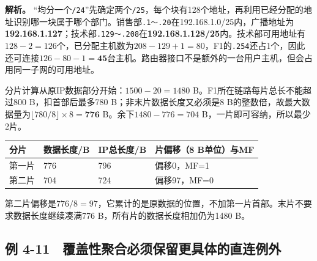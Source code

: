 \textbf{解析。} ``均分一个\texttt{/\allowbreak{}24}''先确定两个\texttt{/\allowbreak{}25}，每个块有128个地址，再利用已经分配的地址识别哪一块属于哪个部门。销售部\texttt{.\allowbreak{}1～.\allowbreak{}20}在192.168.1.0/25内，广播地址为\textbf{192.168.1.127}；技术部\texttt{.\allowbreak{}129～.\allowbreak{}208}在\textbf{192.168.1.128/25}内。技术部可用地址有\(128-2=126\)个，已分配主机数为\(208-129+1=80\)，F1的\texttt{.\allowbreak{}254}还占1个，因此还可连接\(126-80-1=\mathbf{45}\)台主机。路由器接口不是额外的一台用户主机，但会占用同一子网的可用地址。

分片计算从原IP数据部分开始：\(1500-20=1480\) B。F1所在链路每片总长不能超过800 B，扣首部后最多780 B；非末片数据长度又必须是8 B的整数倍，故最大数据量为\(\lfloor780/8\rfloor\times8=\mathbf{776}\) B。余下\(1480-776=704\) B，一片即可容纳，所以最少2片。

\begin{wideblock}

\par\medskip\noindent\begin{minipage}{\linewidth}\fontsize{9.3}{12}\selectfont\begin{tabularx}{\linewidth}{@{}YYYY@{}}
\toprule\noalign{}
分片 & 数据长度/B & IP总长度/B & 片偏移（8 B单位）与MF \\
\midrule\noalign{}


第一片 & 776 & 796 & 偏移0，MF=1 \\
第二片 & 704 & 724 & 偏移97，MF=0 \\
\bottomrule\end{tabularx}
\end{minipage}\par\medskip

\end{wideblock}

第二片偏移是\(776/8=97\)，它累计的是原数据的位置，不加第一片首部。末片不要求数据长度继续凑满776 B，所有片的数据长度相加仍为1480 B。

\subsection{例 4-11　覆盖性聚合必须保留更具体的直连例外}\label{CN04-ex11}

